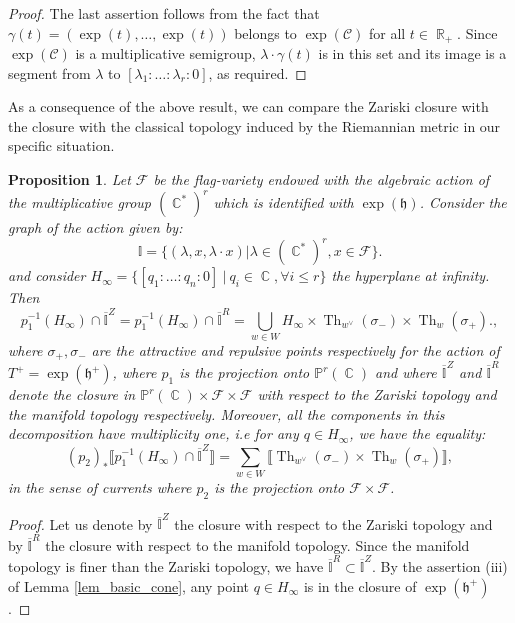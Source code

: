 \documentclass[12pt]{amsbook}%
\newtheorem{prop}[thm]{Proposition}
\theoremstyle{definition}
\theoremstyle{remark}
\numberwithin{section}{chapter}
\numberwithin{subsection}{section}
\numberwithin{figure}{chapter}
\DeclareMathOperator{\C}{\mathbb{C}}
\DeclareMathOperator{\Th}{Th}
\DeclareMathOperator{\R}{\mathbb{R}}
\newcommand\intcur[1]{\llbracket #1 \rrbracket}
\def\bP{{\mathbb{P}}}
\def\cF{{\mathscr{F}}}
\begin{document}
{{\begin{proof}
\smallskip

The last assertion follows from the fact that $\gamma(t) = (\exp(t), \ldots, \exp(t))$ belongs to $\exp(\mathcal{C})$ for all $t \in \R_+$. Since $\exp(\mathcal{C})$ is a multiplicative semigroup,  $\lambda \cdot \gamma(t)$ is in this set and its image is a segment from $\lambda$ to $[\lambda_1 : \ldots : \lambda_r: 0]$, as required.  
\end{proof}


 




As a consequence of the above result, we can compare the Zariski closure with the closure with the classical topology induced by the Riemannian metric in our specific situation.  
\begin{prop} \label{prop_degen_fiber} Let $\cF$ be the flag-variety
endowed  with the  algebraic action of the multiplicative group $(\C^*)^r $ which is identified with $\exp(\mathfrak{h})$. Consider the graph of the action given by: 
\begin{equation*}
\mathbb{I} = \{ (\lambda , x , \lambda \cdot x) | \lambda \in (\C^*)^r , x\in \cF \}. 
\end{equation*}
 and consider $H_\infty = \{ [q_1 : \ldots : q_n : 0]\  | \ q_i \in \C  ,\forall  i \leqslant  r\}$ the hyperplane at infinity.
Then $$p_1^{-1} (H_\infty) \cap \overline{\mathbb{I}}^Z = p_1^{-1} (H_\infty) \cap \overline{\mathbb{I}}^R = \bigcup_{w \in W} H_\infty \times \Th_{w^\vee}(\sigma_-) \times \Th_w(\sigma_+). ,$$ where $\sigma_+, \sigma_-$ are the attractive and repulsive points respectively for the action of $T^+ = \exp(\mathfrak{h}^+)$, where $p_1$ is the projection onto $\bP^r(\C)$ and where $\overline{\mathbb{I}}^Z$ and $\overline{\mathbb{I}}^R$ denote the closure in $\bP^r(\C) \times \cF\times \cF$ with respect to the Zariski topology and the  manifold topology respectively. 
Moreover, all the components in this decomposition have multiplicity one, i.e for any $q \in H_\infty$, we have the equality: 
\begin{equation*}
	(p_2)_* \intcur{p_1^{-1} (H_\infty) \cap \overline{\mathbb{I}}^Z} = \sum_{w\in W} \intcur{\Th_{w^\vee}(\sigma_-) \times \Th_w(\sigma_+)},
\end{equation*} 
in the sense of currents where $p_2$ is the projection onto $\cF\times \cF$.
\end{prop}

\begin{proof} 
Let us denote by $\overline{\mathbb{I}}^Z$ the closure with respect to the Zariski topology and by $\overline{\mathbb{I}}^R$ the closure with respect to the manifold topology. %
Since the manifold topology is finer than the Zariski topology, we have $\overline{\mathbb{I}}^R \subset \overline{\mathbb{I}}^Z$. 
By the assertion (iii) of Lemma   \ref{lem_basic_cone}, any point $q \in H_\infty$ is in the closure of $\exp(\mathfrak{h}^+)$. 



\end{proof}}}
\end{document}
